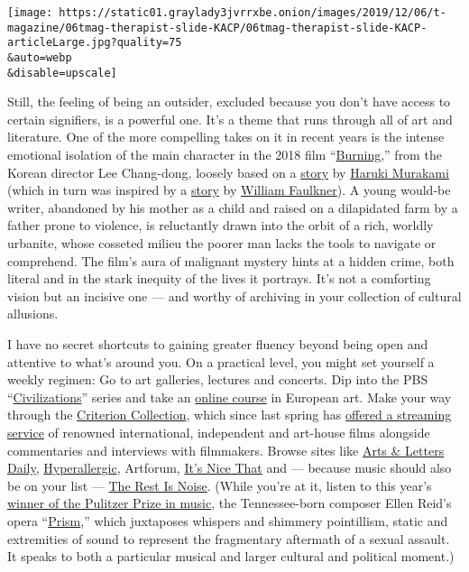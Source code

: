 \texttt{[image: https://static01.graylady3jvrrxbe.onion/images/2019/12/06/t-magazine/06tmag-therapist-slide-KACP/06tmag-therapist-slide-KACP-articleLarge.jpg?quality=75\\\&auto=webp\\\&disable=upscale]}

Still, the feeling of being an outsider, excluded because you don't have
access to certain signifiers, is a powerful one. It's a theme that runs
through all of art and literature. One of the more compelling takes on
it in recent years is the intense emotional isolation of the main
character in the 2018 film
``\href{https://www.nytimes3xbfgragh.onion/watching/titles/movies/674682}{Burning},''
from the Korean director Lee Chang-dong, loosely based on a
\href{https://www.newyorker.com/magazine/1992/11/02/barn-burning}{story}
by
\href{https://www.nytimes3xbfgragh.onion/topic/person/haruki-murakami}{Haruki
Murakami} (which in turn was inspired by a
\href{http://faculty.weber.edu/jyoung/english\%206710/barn\%20burning.pdf}{story}
by
\href{https://www.nytimes3xbfgragh.onion/topic/person/william-faulkner}{William
Faulkner}). A young would-be writer, abandoned by his mother as a child
and raised on a dilapidated farm by a father prone to violence, is
reluctantly drawn into the orbit of a rich, worldly urbanite, whose
cosseted milieu the poorer man lacks the tools to navigate or
comprehend. The film's aura of malignant mystery hints at a hidden
crime, both literal and in the stark inequity of the lives it portrays.
It's not a comforting vision but an incisive one --- and worthy of
archiving in your collection of cultural allusions.

I have no secret shortcuts to gaining greater fluency beyond being open
and attentive to what's around you. On a practical level, you might set
yourself a weekly regimen: Go to art galleries, lectures and concerts.
Dip into the PBS
``\href{https://www.nytimes3xbfgragh.onion/watching/titles/civilizations}{Civilizations}''
series and take an
\href{https://www.thegreatcoursesplus.com/history-of-european-art}{online
course} in European art. Make your way through the
\href{https://www.criterion.com/}{Criterion Collection}, which since
last spring has
\href{https://www.nytimes3xbfgragh.onion/2018/11/16/arts/criterion-channel-streaming-spring-2019.html}{offered
a streaming service} of renowned international, independent and
art-house films alongside commentaries and interviews with filmmakers.
Browse sites like \href{https://www.aldaily.com/}{Arts \& Letters
Daily}, \href{https://hyperallergic.com/}{Hyperallergic}, Artforum,
\href{https://www.itsnicethat.com/}{It's Nice That} and --- because
music should also be on your list ---
\href{https://www.therestisnoise.com/}{The Rest Is Noise}. (While you're
at it, listen to this year's
\href{https://www.nytimes3xbfgragh.onion/2019/04/15/business/media/pulitzer-prize-winners.html}{winner
of the Pulitzer Prize in music}, the Tennessee-born composer Ellen
Reid's opera
``\href{https://ellenreidmusic.com/work/p-r-i-s-m/}{Prism},'' which
juxtaposes whispers and shimmery pointillism, static and extremities of
sound to represent the fragmentary aftermath of a sexual assault. It
speaks to both a particular musical and larger cultural and political
moment.)


